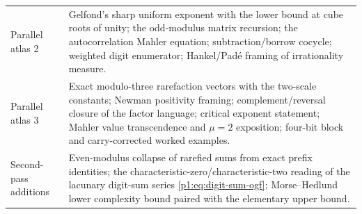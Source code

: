 \documentclass[11pt,oneside]{article}
\numberwithin{equation}{section}
\theoremstyle{definition}
\theoremstyle{remark}
\begin{document}
\begin{longtable}{@{}p{}p{}@{}}
Parallel atlas 2 & Gelfond's sharp uniform exponent with the lower bound at cube roots of unity; the odd-modulus matrix recursion; the autocorrelation Mahler equation; subtraction/borrow cocycle; weighted digit enumerator; Hankel/Pad\'e framing of irrationality measure. \\
Parallel atlas 3 & Exact modulo-three rarefaction vectors with the two-scale constants; Newman positivity framing; complement/reversal closure of the factor language; critical exponent statement; Mahler value transcendence and \(\mu=2\) exposition; four-bit block and carry-corrected worked examples. \\
Second-pass additions & Even-modulus collapse of rarefied sums from exact prefix identities; the characteristic-zero/characteristic-two reading of the lacunary digit-sum series \eqref{p1:eq:digit-sum-ogf}; Morse--Hedlund lower complexity bound paired with the elementary upper bound. \\
\bottomrule
\end{longtable}
\renewcommand{\arraystretch}{1}
\end{document}
